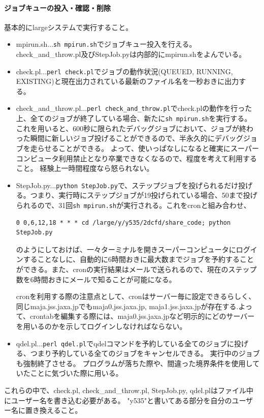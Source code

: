 \documentclass{jsarticle}
\begin{document}
\paragraph{ジョブキューの投入・確認・削除}
基本的にlargeシステムで実行すること。
\begin{itemize}
\item mpirun.sh...\verb|sh mpirun.sh|でジョブキュー投入を行える。check\_and\_throw.pl及びStepJob.pyは内部的にmpirun.shをよんでいる。
\item check.pl...\verb|perl check.pl|でジョブの動作状況(QUEUED, RUNNING, EXISTING)と現在出力されている最新のファイル名を一秒おきに出力する。
\item check\_and\_throw.pl...\verb|perl check_and_throw.pl|でcheck.plの動作を行った上、全てのジョブが終了している場合、新たに\verb|sh mpirun.sh|を実行する。
これを用いると、600秒に限られたデバッグジョブにおいて、ジョブが終わった瞬間に新しいジョブ投げることができるので、半永久的にデバッグジョブを走らせることができる。
よって、使いっぱなしになると確実にスーパーコンピュータ利用禁止となり卒業できなくなるので、程度を考えて利用すること。
経験上一時間程度なら怒られない。
\item StepJob.py...\verb|python StepJob.py|で、ステップジョブを投げられるだけ投げる。つまり、実行時にステップジョブが19投げられている場合、50まで投げられるので、31回\verb|sh mpirun.sh|が実行される。これをcronと組み合わせ、
\begin{verbatim}
0 0,6,12,18 * * * cd /large/y/y535/2dcfd/share_code; python StepJob.py
\end{verbatim}
のようにしておけば、一々ターミナルを開きスーパーコンピュータにログインすることなしに、自動的に6時間おきに最大数までジョブを予約することができる。また、cronの実行結果はメールで送られるので、現在のステップ数を6時間おきにメールで知ることが可能になる。

cronを利用する際の注意点として、cronはサーバー毎に設定できるらしく、同じmaja.jss.jaxa.jpでもmaja0.jss.jaxa.jp, maja1.jss.jaxa.jpが存在する.よって、crontabを編集する際には、maja0.jss.jaxa.jpなど明示的にどのサーバーを用いるのかを示してログインしなければならない。
\item qdel.pl...\verb|perl qdel.pl|でqdelコマンドを予約している全てのジョブに投げる、つまり予約している全てのジョブをキャンセルできる。
実行中のジョブも強制終了させる。
プログラムが落ちた際や、間違った境界条件を使用していたことに気づいた際に用いる。
\end{itemize}

これらの中で、check.pl, check\_and\_throw.pl, StepJob.py, qdel.plはファイル中にユーザー名を書き込む必要がある。
"y535"と書いてある部分を自分のユーザー名に置き換えること。
\end{document}
